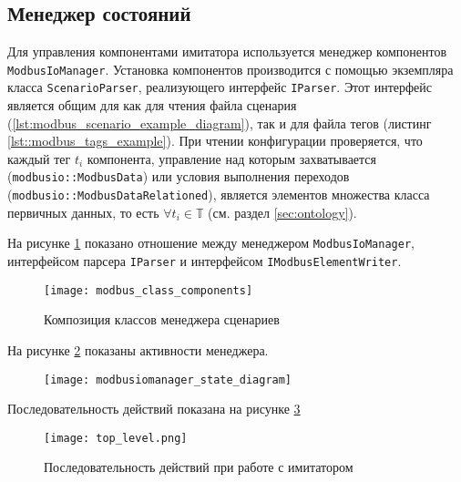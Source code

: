 \subsection{Менеджер состояний}
Для управления компонентами имитатора используется менеджер компонентов \texttt{ModbusIoManager}.
Установка компонентов производится с помощью экземпляра класса \texttt{ScenarioParser}, реализующего интерфейс \texttt{IParser}.
Этот интерфейс является общим для как для чтения файла сценария (\ref{lst:modbus_scenario_example_diagram}),
так и для файла тегов (листинг \ref{lst::modbus_tags_example}).
При чтении конфигурации проверяется, что каждый тег $t_i$ компонента,
управление над которым захватывается (\texttt{modbusio::ModbusData}) или условия выполнения переходов (\texttt{modbusio::ModbusDataRelationed}),
является элементов множества класса первичных данных, то есть $\forall t_i \in \mathbb{T}$ (см. раздел \ref{sec:ontology}).

На рисунке \ref{fig:modbus_class_components} показано отношение между менеджером \texttt{ModbusIoManager},
интерфейсом парсера \texttt{IParser} и интерфейсом \texttt{IModbusElementWriter}.
\begin{center}
    \begin{figure}[hb!]
        \texttt{[image: modbus\_class\_components]}
        \caption{Композиция классов менеджера сценариев}\label{fig:modbus_class_components}
    \end{figure}
\end{center}

На рисунке \ref{fig:modbusiomanager_state_diagram} показаны активности менеджера.
\begin{center}
    \begin{figure}
        \texttt{[image: modbusiomanager\_state\_diagram]}
        \caption{}\label{fig:modbusiomanager_state_diagram}
    \end{figure}
\end{center}


Последовательность действий показана на рисунке \ref{fig:top_level_sequence} \cite[стр. 239]{book:oop:oop_analize}
\begin{center}
    \begin{figure}
        \texttt{[image: top\_level.png]}
        \caption{Последовательность действий при работе с имитатором}\label{fig:top_level_sequence}
    \end{figure}
\end{center}

